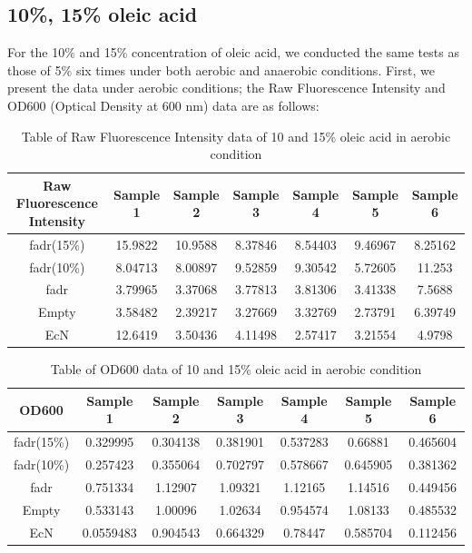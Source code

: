 \documentclass[UTF8]{article}
\begin{document}
\subsection{10\%, 15\% oleic acid}

For the 10\% and 15\% concentration of oleic acid, we conducted the same tests as those of 5\% six times under both aerobic and anaerobic conditions. First, we present the data under aerobic conditions; the Raw Fluorescence Intensity and OD600 (Optical Density at 600 nm) data are as follows:

\begin{table}[h]
	\centering
	\begin{tabular}{|c|c|c|c|c|c|c|}
		\hline
		Raw Fluorescence Intensity & Sample 1 & Sample 2 & Sample 3 & Sample 4 & Sample 5 & Sample 6 \\ \hline
		fadr(15\%) & 15.9822 & 10.9588 & 8.37846 & 8.54403 & 9.46967 & 8.25162 \\ \hline
		fadr(10\%) & 8.04713 & 8.00897 & 9.52859 & 9.30542 & 5.72605 & 11.253 \\ \hline
		fadr & 3.79965 & 3.37068 & 3.77813 & 3.81306 & 3.41338 & 7.5688 \\ \hline
		Empty & 3.58482 & 2.39217 & 3.27669 & 3.32769 & 2.73791 & 6.39749 \\ \hline
		EcN & 12.6419 & 3.50436 & 4.11498 & 2.57417 & 3.21554 & 4.9798 \\ \hline
	\end{tabular}
	\caption{Table of Raw Fluorescence Intensity data of 10 and 15\% oleic acid in aerobic condition}
\end{table}

\begin{table}[h]
	\centering
	\begin{tabular}{|c|c|c|c|c|c|c|}
		\hline
		OD600 & Sample 1 & Sample 2 & Sample 3 & Sample 4 & Sample 5 & Sample 6 \\ \hline
		fadr(15\%) & 0.329995 & 0.304138 & 0.381901 & 0.537283 & 0.66881 & 0.465604 \\ \hline
		fadr(10\%) & 0.257423 & 0.355064 & 0.702797 & 0.578667 & 0.645905 & 0.381362 \\ \hline
		fadr & 0.751334 & 1.12907 & 1.09321 & 1.12165 & 1.14516 & 0.449456 \\ \hline
		Empty & 0.533143 & 1.00096 & 1.02634 & 0.954574 & 1.08133 & 0.485532 \\ \hline
		EcN & 0.0559483 & 0.904543 & 0.664329 & 0.78447 & 0.585704 & 0.112456 \\ \hline
	\end{tabular}
	\caption{Table of OD600 data of 10 and 15\% oleic acid in aerobic condition}
\end{table}
\end{document}

